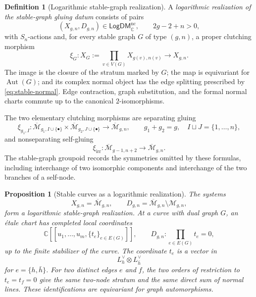 \documentclass[11pt,letterpaper,twoside]{article}
\theoremstyle{plain}
\newtheorem{proposition}[theorem]{Proposition}
\theoremstyle{definition}
\newtheorem{definition}[theorem]{Definition}
\theoremstyle{remark}
\begin{document}
\begin{definition}[Logarithmic stable-graph realization]\label{def:log-graph-realization}
A \emph{logarithmic realization of the stable-graph gluing datum} consists of pairs
\[
 (X_{g,n},D_{g,n})\in\mathsf{LogDM}_{\mathbb C}^{\mathrm{nc}},
 \qquad 2g-2+n>0,
\]
with \(S_n\)-actions and, for every stable graph \(G\) of type \((g,n)\), a proper clutching morphism
\begin{equation}\label{eq:abstract-clutching}
 \xi_G:X_G:=\prod_{v\in V(G)}
 X_{g(v),n(v)}
 \longrightarrow X_{g,n}.
\end{equation}
The image is the closure of the stratum marked by \(G\); the map is equivariant for \(\operatorname{Aut}(G)\); and its complex normal object has the edge splitting prescribed by \eqref{eq:stable-normal}.  Edge contraction, graph substitution, and the formal normal charts commute up to the canonical \(2\)-isomorphisms.
\end{definition}

The two elementary clutching morphisms are separating gluing
\begin{equation}\label{eq:separating-clutching}
 \xi_{g_1,I}:
 \overline{\mathcal M}_{g_1,I\cup\{\bullet\}}
 \times
 \overline{\mathcal M}_{g_2,J\cup\{\bullet\}}
 \longrightarrow
 \overline{\mathcal M}_{g,n},
 \qquad g_1+g_2=g,\quad I\sqcup J=\{1,\ldots,n\},
\end{equation}
and nonseparating self-gluing
\begin{equation}\label{eq:nonseparating-clutching}
 \xi_{\mathrm{irr}}:
 \overline{\mathcal M}_{g-1,n+2}
 \longrightarrow
 \overline{\mathcal M}_{g,n}.
\end{equation}
The stable-graph groupoid records the symmetries omitted by these formulas, including interchange of two isomorphic components and interchange of the two branches of a self-node.

\begin{proposition}[Stable curves as a logarithmic realization]\label{prop:stable-curves-log-realization}
The systems
\[
 X_{g,n}=\overline{\mathcal M}_{g,n},
 \qquad
 D_{g,n}=\overline{\mathcal M}_{g,n}\setminus\mathcal M_{g,n},
\]
form a logarithmic stable-graph realization.  At a curve with dual graph \(G\), an \'etale chart has completed local coordinates
\begin{equation}\label{eq:stable-curve-local-chart}
 \mathbb C[[u_1,\ldots,u_m,\{t_e\}_{e\in E(G)}]],
 \qquad
 D_{g,n}:\prod_{e\in E(G)}t_e=0,
\end{equation}
up to the finite stabilizer of the curve.  The coordinate \(t_e\) is a vector in
\[
 L_h^\vee\otimes L_{\bar h}^\vee
\]
for \(e=\{h,\bar h\}\).  For two distinct edges \(e\) and \(f\), the two orders of restriction to \(t_e=t_f=0\) give the same two-node stratum and the same direct sum of normal lines.  These identifications are equivariant for graph automorphisms.
\end{proposition}
\end{document}
